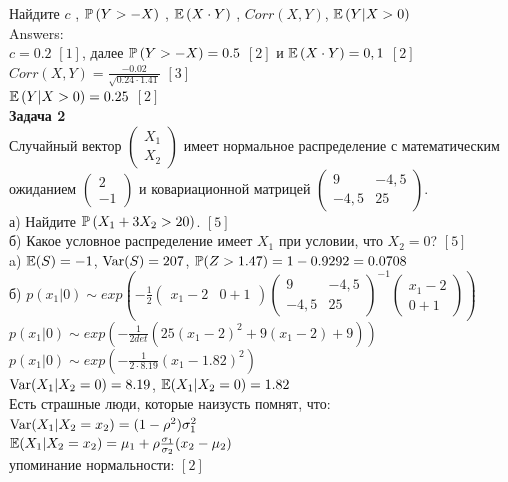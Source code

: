\documentclass[12pt, a4paper]{article}\usepackage[]{graphicx}\usepackage[]{color}
\begin{document}
Найдите  $c$ ,  $\P\left(Y>-X\right)$ ,  $\E\left(X\cdot Y
\right)$ , $Corr(X,Y)$, $\E\left(Y|X>0\right)$ \\
Answers: \\
$c=0.2$ $[1]$, далее $\P\left(Y>-X\right)=0.5$ $[2]$ и $\E\left(X\cdot Y\right)=0,1$ $[2]$ \\
$Corr(X,Y)=\frac{-0.02}{\sqrt{0.24\cdot 1.41}}$ $[3]$ \\
$\E\left(Y|X>0\right)=0.25$ $[2]$ \\

\textbf{Задача 2} \\ %
Случайный вектор  $\left(\begin{array}{c}
{X_{1} } \\ {X_{2} }
\end{array}\right)$  имеет нормальное распределение с
математическим ожиданием  $\left(\begin{array}{c} {2} \\ {-1}
\end{array}\right)$  и ковариационной матрицей
$\left(\begin{array}{cc} {9} & {-4,5} \\ {-4,5} & {25}
\end{array}\right)$. \\
а) Найдите  $\P\left(X_{1} +3X_{2} >20\right)$. $[5]$ \\
б) Какое условное распределение имеет $X_{1}$ при условии, что $X_{2}=0$? $[5]$ \\
a) $\E(S)=-1$, $\Var(S)=207$, $\P(Z>1.47)=1-0.9292=0.0708$ \\
б) $p(x_{1}|0)\sim exp\left(-\frac{1}{2}\left(\begin{array}{cc} {x_{1}-2} & {0+1} \end{array}\right) \left(\begin{array}{cc} {9} & {-4,5} \\ {-4,5} & {25}
\end{array}\right)^{-1}\left(\begin{array}{c} {x_{1}-2} \\ {0+1}
\end{array}\right)\right)$ \\
$p(x_{1}|0)\sim exp\left(-\frac{1}{2det}(25(x_{1}-2)^{2}+9(x_{1}-2)+9)\right)$ \\
$p(x_{1}|0)\sim exp\left(-\frac{1}{2\cdot 8.19}(x_{1}-1.82)^{2}\right)$ \\
$\Var(X_{1}|X_{2}=0)=8.19$, $\E(X_{1}|X_{2}=0)=1.82$ \\
Есть страшные люди, которые наизусть помнят, что: \\
$\Var(X_{1}|X_{2}=x_{2})=(1-\rho^{2})\sigma_{1}^{2}$ \\
$\E(X_{1}|X_{2}=x_{2})=\mu_{1} + \rho\frac{\sigma_{1}}{\sigma_{2}}(x_{2}-\mu_{2})$ \\
упоминание нормальности: $[2]$ \\
\end{document}
